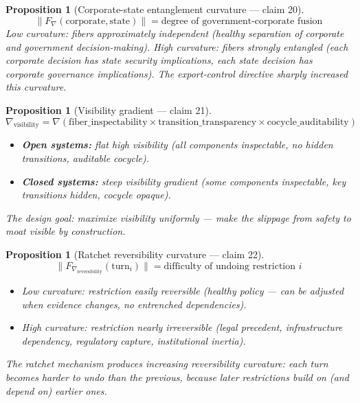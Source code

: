 \documentclass[11pt,a4paper]{article}
\newtheorem{proposition}[definition]{Proposition}
\begin{document}
\begin{proposition}[Corporate-state entanglement curvature --- claim 20]
\label{prop:entangle_curv}
\[
  \|F_\nabla(\text{corporate}, \text{state})\| = \text{degree of
    government-corporate fusion}
\]
Low curvature: fibers approximately independent (healthy separation of
corporate and government decision-making). High curvature: fibers
strongly entangled (each corporate decision has state security
implications, each state decision has corporate governance implications).
The export-control directive sharply increased this curvature.
\end{proposition}

\begin{proposition}[Visibility gradient --- claim 21]
\label{prop:vis_grad}
\[
  \nabla_{\text{visibility}} = \nabla\left(\text{fiber\_inspectability}
    \times \text{transition\_transparency} \times
    \text{cocycle\_auditability}\right)
\]
\begin{itemize}
  \item \textbf{Open systems:} flat high visibility (all components
    inspectable, no hidden transitions, auditable cocycle).
  \item \textbf{Closed systems:} steep visibility gradient (some
    components inspectable, key transitions hidden, cocycle opaque).
\end{itemize}
The design goal: maximize visibility uniformly --- make the slippage
from safety to moat visible by construction.
\end{proposition}

\begin{proposition}[Ratchet reversibility curvature --- claim 22]
\label{prop:rev_curv}
\[
  \|F_{\nabla_{\text{reversibility}}}(\text{turn}_i)\| = \text{difficulty
    of undoing restriction } i
\]
\begin{itemize}
  \item Low curvature: restriction easily reversible (healthy policy
    --- can be adjusted when evidence changes, no entrenched
    dependencies).
  \item High curvature: restriction nearly irreversible (legal precedent,
    infrastructure dependency, regulatory capture, institutional inertia).
\end{itemize}
The ratchet mechanism produces increasing reversibility curvature:
each turn becomes harder to undo than the previous, because later
restrictions build on (and depend on) earlier ones.
\end{proposition}
\end{document}

